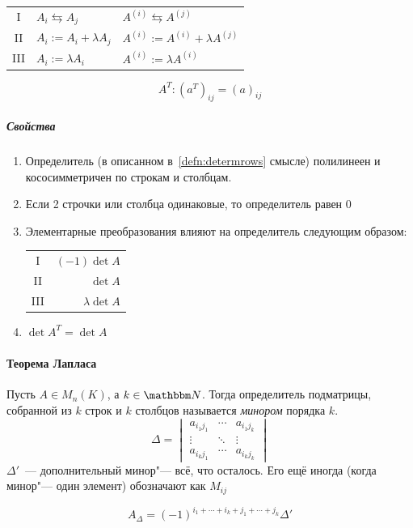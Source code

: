 \documentclass[12pt]{../../../notes}
\begin{document}
\begin{defn}\label{defn:elemtranf}
  \noindent\newline\par
  \begin{tabular}{c|l|l}
    I   & $A_i \leftrightarrows A_j$ & $A^{(i)} \leftrightarrows A^{(j)}$     \\
    II  & $A_i := A_i + \lambda A_j$ & $A^{(i)} := A^{(i)} + \lambda A^{(j)}$ \\
    III & $A_i := \lambda A_i$       & $A^{(i)} := \lambda A^{(i)}$           
  \end{tabular}
\end{defn}
\begin{defn}\label{defn:transpose}
  \[
    A^T \colon (a^T)_{ij} = (a)_{ij}
  \]
\end{defn}

\subparagraph{Свойства}
\begin{enumerate}
  \item Определитель (в описанном в~\ref{defn:determrows} смысле) полилинеен и кососимметричен по
    строкам и столбцам.
  \item Если 2 строчки или столбца одинаковые, то определитель равен 0
  \item Элементарные преобразования влияют на определитель следующим образом:\par
    \begin{tabular}{c|r}
      I   & $(-1)\det A$ \\
      II  & $\det A$     \\
      III & $\lambda \det A$
    \end{tabular}
  \item $\det A^T = \det A$
\end{enumerate}


\paragraph{Теорема Лапласа}
\begin{defn}[Минор]\label{defn:minor}
  Пусть $A\in M_n(K)$, а $k\in \N$. Тогда определитель подматрицы, собранной из $k$ строк и $k$
  столбцов называется \emph{минором} порядка $k$.
  \[
    \Delta = 
    \begin{vmatrix}
      a_{i_1j_1} & \cdots & a_{i_1j_k} \\
      \vdots & \ddots & \vdots \\
      a_{i_kj_1} & \cdots & a_{i_kj_k} 
    \end{vmatrix}
  \]
  $\Delta'$~--- дополнительный минор"--- всё, что осталось.
  Его ещё иногда (когда минор"--- один элемент) обозначают как $M_{ij}$
\end{defn}
\begin{defn}\label{defn:cofactor}
  \[
    A_\Delta = (-1)^{i_1 + \dotsb + i_k + j_1 + \dotsb + j_k} \Delta'
  \]
\end{defn}
\end{document}
